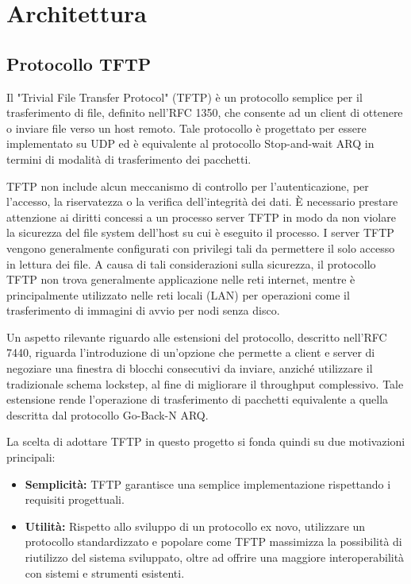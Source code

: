 \documentclass[12pt]{article}
\begin{document}
\section{Architettura} {


\subsection{Protocollo TFTP}

Il "Trivial File Transfer Protocol" (TFTP) è un protocollo semplice per il trasferimento di file, definito nell'RFC 1350, che consente ad un client di ottenere o inviare file verso un host remoto.
Tale protocollo è progettato per essere implementato su UDP ed è equivalente al protocollo Stop-and-wait ARQ in termini di modalità di trasferimento dei pacchetti.

TFTP non include alcun meccanismo di controllo per l'autenticazione, per l'accesso, la riservatezza o la verifica dell'integrità dei dati. È necessario prestare attenzione ai diritti concessi a un processo server TFTP in modo da non violare la sicurezza del file system dell'host su cui è eseguito il processo.
I server TFTP vengono generalmente configurati con privilegi tali da permettere il solo accesso in lettura dei file.
A causa di tali considerazioni sulla sicurezza, il protocollo TFTP non trova generalmente applicazione nelle reti internet, mentre è principalmente utilizzato nelle reti locali (LAN) per operazioni come il trasferimento di immagini di avvio per nodi senza disco.

Un aspetto rilevante riguardo alle estensioni del protocollo, descritto nell'RFC 7440, riguarda l'introduzione di un'opzione che permette a client e server di negoziare una finestra di blocchi consecutivi da inviare, anziché utilizzare il tradizionale schema lockstep, al fine di migliorare il throughput complessivo. Tale estensione rende l'operazione di trasferimento di pacchetti equivalente a quella descritta dal protocollo Go-Back-N ARQ.

La scelta di adottare TFTP in questo progetto si fonda quindi su due motivazioni principali:
\begin{itemize}
    \item \textbf{Semplicità:} TFTP garantisce una semplice implementazione rispettando i requisiti progettuali.
    \item \textbf{Utilità:} Rispetto allo sviluppo di un protocollo ex novo, utilizzare un protocollo standardizzato e popolare come TFTP massimizza la possibilità di riutilizzo del sistema sviluppato, oltre ad offrire una maggiore interoperabilità con sistemi e strumenti esistenti.
\end{itemize}

}
\end{document}

